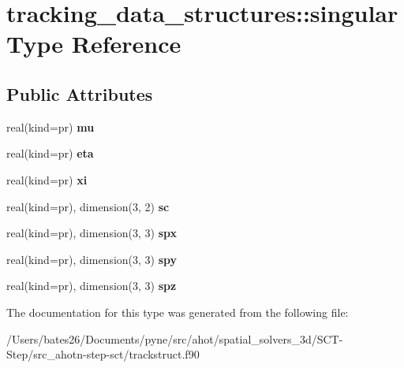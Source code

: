 \hypertarget{structtracking__data__structures_1_1singular}{\section{tracking\+\_\+data\+\_\+structures\+:\+:singular Type Reference}
\label{structtracking__data__structures_1_1singular}
}
\subsection*{Public Attributes}
\begin{DoxyCompactItemize}
\item 
\hypertarget{structtracking__data__structures_1_1singular_acd79fe7d9374778a1a073f01d33bc323}{real(kind=pr) {\bfseries mu}}\label{structtracking__data__structures_1_1singular_acd79fe7d9374778a1a073f01d33bc323}

\item 
\hypertarget{structtracking__data__structures_1_1singular_a8015e49ee70edd759eb801446b40de59}{real(kind=pr) {\bfseries eta}}\label{structtracking__data__structures_1_1singular_a8015e49ee70edd759eb801446b40de59}

\item 
\hypertarget{structtracking__data__structures_1_1singular_ac42e62b9f85705c6e68a6d07bc6c889c}{real(kind=pr) {\bfseries xi}}\label{structtracking__data__structures_1_1singular_ac42e62b9f85705c6e68a6d07bc6c889c}

\item 
\hypertarget{structtracking__data__structures_1_1singular_ae99e040b2944a8f103cb730cef072f7b}{real(kind=pr), dimension(3, 2) {\bfseries sc}}\label{structtracking__data__structures_1_1singular_ae99e040b2944a8f103cb730cef072f7b}

\item 
\hypertarget{structtracking__data__structures_1_1singular_aeb81711c1d7153fe3dc8eae682f08134}{real(kind=pr), dimension(3, 3) {\bfseries spx}}\label{structtracking__data__structures_1_1singular_aeb81711c1d7153fe3dc8eae682f08134}

\item 
\hypertarget{structtracking__data__structures_1_1singular_ab7f1cf71b301b3dd7b30004bb3fecbea}{real(kind=pr), dimension(3, 3) {\bfseries spy}}\label{structtracking__data__structures_1_1singular_ab7f1cf71b301b3dd7b30004bb3fecbea}

\item 
\hypertarget{structtracking__data__structures_1_1singular_a5bfe4d508ca8ba24ddd3c14c20c03086}{real(kind=pr), dimension(3, 3) {\bfseries spz}}\label{structtracking__data__structures_1_1singular_a5bfe4d508ca8ba24ddd3c14c20c03086}

\end{DoxyCompactItemize}


The documentation for this type was generated from the following file\+:\begin{DoxyCompactItemize}
\item 
/\+Users/bates26/\+Documents/pyne/src/ahot/spatial\+\_\+solvers\+\_\+3d/\+S\+C\+T-\/\+Step/src\+\_\+ahotn-\/step-\/sct/trackstruct.\+f90\end{DoxyCompactItemize}
